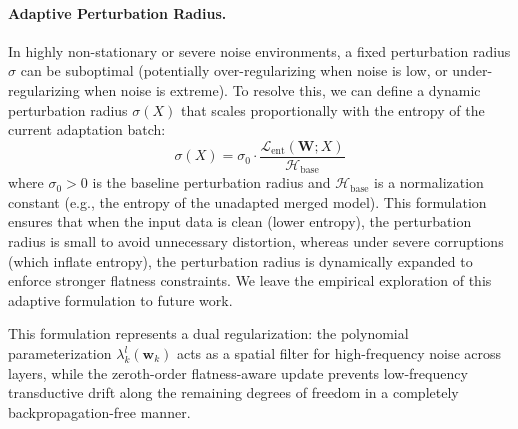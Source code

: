 \paragraph{Adaptive Perturbation Radius.} In highly non-stationary or severe noise environments, a fixed perturbation radius $\sigma$ can be suboptimal (potentially over-regularizing when noise is low, or under-regularizing when noise is extreme). To resolve this, we can define a dynamic perturbation radius $\sigma(X)$ that scales proportionally with the entropy of the current adaptation batch:
\begin{equation}
    \sigma(X) = \sigma_0 \cdot \frac{\mathcal{L}_{\text{ent}}(\mathbf{W}; X)}{\mathcal{H}_{\text{base}}}
\end{equation}
where $\sigma_0 > 0$ is the baseline perturbation radius and $\mathcal{H}_{\text{base}}$ is a normalization constant (e.g., the entropy of the unadapted merged model). This formulation ensures that when the input data is clean (lower entropy), the perturbation radius is small to avoid unnecessary distortion, whereas under severe corruptions (which inflate entropy), the perturbation radius is dynamically expanded to enforce stronger flatness constraints. We leave the empirical exploration of this adaptive formulation to future work.

This formulation represents a dual regularization: the polynomial parameterization $\lambda^l_k(\mathbf{w}_k)$ acts as a spatial filter for high-frequency noise across layers, while the zeroth-order flatness-aware update prevents low-frequency transductive drift along the remaining degrees of freedom in a completely backpropagation-free manner.

